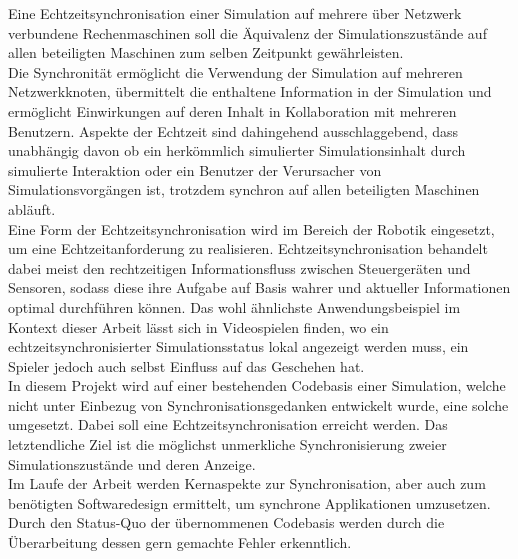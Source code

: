 Eine Echtzeitsynchronisation einer Simulation auf mehrere über Netzwerk verbundene Rechenmaschinen soll die Äquivalenz der Simulationszustände auf allen beteiligten Maschinen zum selben Zeitpunkt gewährleisten.\\
Die Synchronität ermöglicht die Verwendung der Simulation auf mehreren Netzwerkknoten, übermittelt die enthaltene Information in der Simulation und ermöglicht Einwirkungen auf deren Inhalt in Kollaboration mit mehreren Benutzern.
Aspekte der Echtzeit sind dahingehend ausschlaggebend, dass unabhängig davon ob ein
herkömmlich simulierter Simulationsinhalt durch simulierte Interaktion oder ein Benutzer der Verursacher von Simulationsvorgängen ist, trotzdem synchron auf allen beteiligten Maschinen abläuft.\\

Eine Form der Echtzeitsynchronisation wird im Bereich der Robotik eingesetzt, um eine Echtzeitanforderung zu realisieren. Echtzeitsynchronisation behandelt dabei meist den rechtzeitigen Informationsfluss zwischen Steuergeräten und Sensoren, sodass diese ihre Aufgabe auf Basis wahrer und aktueller Informationen optimal durchführen können.
Das wohl ähnlichste Anwendungsbeispiel im Kontext dieser Arbeit lässt sich in Videospielen finden, wo ein echtzeitsynchronisierter Simulationsstatus lokal angezeigt werden muss, ein Spieler jedoch auch selbst Einfluss auf das Geschehen hat.\\
In diesem Projekt wird auf einer bestehenden Codebasis einer Simulation, welche nicht unter Einbezug von Synchronisationsgedanken entwickelt wurde, eine solche umgesetzt. Dabei soll eine Echtzeitsynchronisation erreicht werden.
Das letztendliche Ziel ist die möglichst unmerkliche Synchronisierung zweier Simulationszustände und deren Anzeige.\\
Im Laufe der Arbeit werden Kernaspekte zur Synchronisation, aber auch zum benötigten Softwaredesign ermittelt, um synchrone Applikationen umzusetzen. Durch den Status-Quo der übernommenen Codebasis werden durch die Überarbeitung dessen gern gemachte Fehler erkenntlich.